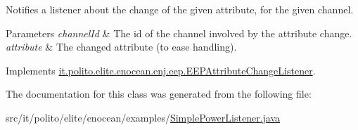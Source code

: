 Notifies a listener about the change of the given attribute, for the given channel. 
\begin{DoxyParams}{Parameters}
{\em channel\+Id} & The id of the channel involved by the attribute change. \\
\hline
{\em attribute} & The changed attribute (to ease handling). \\
\hline
\end{DoxyParams}


Implements \hyperlink{interfaceit_1_1polito_1_1elite_1_1enocean_1_1enj_1_1eep_1_1_e_e_p_attribute_change_listener_a8ed543f4de048252dfd133116d488382}{it.\+polito.\+elite.\+enocean.\+enj.\+eep.\+E\+E\+P\+Attribute\+Change\+Listener}.



The documentation for this class was generated from the following file\+:\begin{DoxyCompactItemize}
\item 
src/it/polito/elite/enocean/examples/\hyperlink{_simple_power_listener_8java}{Simple\+Power\+Listener.\+java}\end{DoxyCompactItemize}
